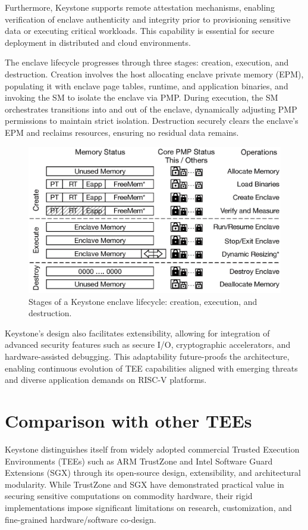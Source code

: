Furthermore, Keystone supports remote attestation mechanisms, enabling verification of enclave authenticity and integrity prior to provisioning sensitive data or executing critical workloads. This capability is essential for secure deployment in distributed and cloud environments.

The enclave lifecycle progresses through three stages: creation, execution, and destruction. Creation involves the host allocating enclave private memory (EPM), populating it with enclave page tables, runtime, and application binaries, and invoking the SM to isolate the enclave via PMP. During execution, the SM orchestrates transitions into and out of the enclave, dynamically adjusting PMP permissions to maintain strict isolation. Destruction securely clears the enclave’s EPM and reclaims resources, ensuring no residual data remains.

\begin{figure}[htbp]
    \centering
    \includegraphics[width=0.9\linewidth]{figures/enclave_lifecycle.png}
    \caption{Stages of a Keystone enclave lifecycle: creation, execution, and destruction.}
    \label{fig:enclave_lifecycle}
\end{figure}

Keystone’s design also facilitates extensibility, allowing for integration of advanced security features such as secure I/O, cryptographic accelerators, and hardware-assisted debugging. This adaptability future-proofs the architecture, enabling continuous evolution of TEE capabilities aligned with emerging threats and diverse application demands on RISC-V platforms.

\section{Comparison with other TEEs}

Keystone distinguishes itself from widely adopted commercial Trusted Execution Environments (TEEs) such as ARM TrustZone and Intel Software Guard Extensions (SGX) through its open-source design, extensibility, and architectural modularity. While TrustZone and SGX have demonstrated practical value in securing sensitive computations on commodity hardware, their rigid implementations impose significant limitations on research, customization, and fine-grained hardware/software co-design.

